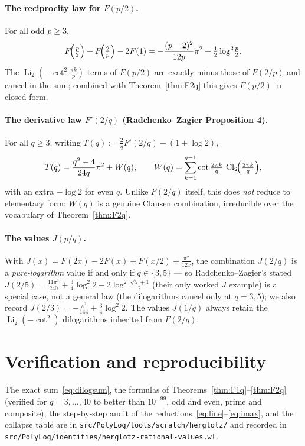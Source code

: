 \documentclass[11pt]{article}
\DeclareMathOperator{\Li}{Li}
\newcommand{\Cl}{\operatorname{Cl}}
\theoremstyle{plain}\newtheorem{theorem}{Theorem}\newtheorem{proposition}[theorem]{Proposition}
\theoremstyle{remark}\newtheorem{remark}[theorem]{Remark}
\begin{document}
\paragraph{The reciprocity law for $F(p/2)$.} For all odd $p\ge3$,
\[
  F\!\Bigl(\tfrac p2\Bigr)+F\!\Bigl(\tfrac2p\Bigr)-2F(1)=-\frac{(p-2)^2}{12p}\pi^2+\tfrac12\log^2\!\tfrac p2 .
\]
The $\Li_2(-\cot^2\frac{\pi k}{p})$ terms of $F(p/2)$ are exactly minus those of $F(2/p)$ and cancel in the sum;
combined with Theorem~\ref{thm:F2q} this gives $F(p/2)$ in closed form.

\paragraph{The derivative law $F'(2/q)$ (Radchenko--Zagier Proposition 4).} For all $q\ge3$, writing
$T(q):=\tfrac2q F'(2/q)-(1+\log2)$,
\[
  T(q)=\frac{q^2-4}{24q}\pi^2+W(q),\qquad W(q)=\sum_{k=1}^{q-1}\cot\tfrac{2\pi k}{q}\,\Cl_2\!\Bigl(\tfrac{2\pi k}q\Bigr),
\]
with an extra $-\log2$ for even $q$. Unlike $F(2/q)$ itself, this does \emph{not} reduce to elementary form:
$W(q)$ is a genuine Clausen combination, irreducible over the vocabulary of Theorem~\ref{thm:F2q}.

\paragraph{The values $J(p/q)$.} With $J(x)=F(2x)-2F(x)+F(x/2)+\tfrac{\pi^2}{12x}$, the combination $J(2/q)$ is a
\emph{pure-logarithm} value if and only if $q\in\{3,5\}$ --- so Radchenko--Zagier's stated
$J(2/5)=\tfrac{11\pi^2}{240}+\tfrac34\log^2 2-2\log^2\tfrac{\sqrt5+1}2$ (their only worked $J$ example) is a
special case, not a general law (the dilogarithms cancel only at $q=3,5$); we also record
$J(2/3)=-\tfrac{\pi^2}{144}+\tfrac34\log^2 2$. The values $J(1/q)$ always retain the $\Li_2(-\cot^2)$
dilogarithms inherited from $F(2/q)$.

\section*{Verification and reproducibility}
The exact sum~\eqref{eq:dilogsum}, the formulas of Theorems~\ref{thm:F1q}--\ref{thm:F2q} (verified for
$q=3,\dots,40$ to better than $10^{-99}$, odd and even, prime and composite), the step-by-step audit of the
reductions~\eqref{eq:line}--\eqref{eq:imax}, and the collapse table are in
\texttt{src/PolyLog/tools/scratch/herglotz/} and recorded in
\texttt{src/PolyLog/identities/herglotz-rational-values.wl}.
\end{document}
